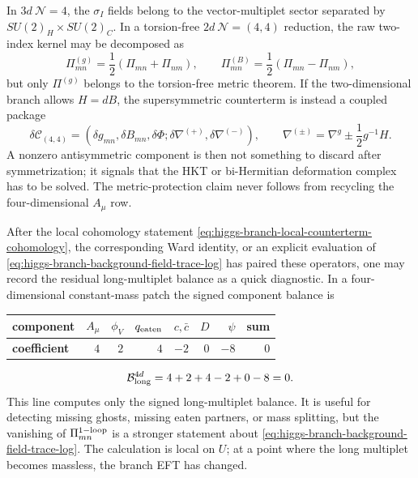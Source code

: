 \begin{example}
In \(3d\ \mathcal N=4\), the \(\sigma_I\) fields belong to the vector-multiplet
sector separated by \(SU(2)_H\times SU(2)_C\).  In a torsion-free
\(2d\ \mathcal N=(4,4)\) reduction, the raw two-index kernel may be decomposed
as
\[
  \Pi_{mn}^{(g)}
  =
  \frac12(\Pi_{mn}+\Pi_{nm}),
  \qquad
  \Pi_{mn}^{(B)}
  =
  \frac12(\Pi_{mn}-\Pi_{nm}),
\]
but only \(\Pi^{(g)}\) belongs to the torsion-free metric theorem.  If the
two-dimensional branch allows \(H=dB\), the supersymmetric counterterm is instead
a coupled package
\[
  \delta{\mathcal C}_{(4,4)}
  =
  (\delta g_{mn},\delta B_{mn},\delta\Phi;\delta\nabla^{(+)},
  \delta\nabla^{(-)}),
  \qquad
  \nabla^{(\pm)}
  =
  \nabla^g\pm\frac12 g^{-1}H .
\]
A nonzero antisymmetric component is then not something to discard after
symmetrization; it signals that the HKT or bi-Hermitian deformation complex has
to be solved.  The metric-protection claim never follows from recycling the
four-dimensional \(A_\mu\) row.
\end{example}

After the local cohomology statement
\eqref{eq:higgs-branch-local-counterterm-cohomology}, the corresponding Ward
identity, or an explicit evaluation of
\eqref{eq:higgs-branch-background-field-trace-log} has paired these operators,
one may record the residual long-multiplet balance as a quick diagnostic.  In a
four-dimensional constant-mass patch the signed component balance is
\begin{center}
\begin{tabular}{@{}lrrrrrrr@{}}
\textbf{component}
& \(A_\mu\) & \(\phi_V\) & \(q_{\rm eaten}\)
& \(c,\bar c\) & \(D\) & \(\psi\) & \textbf{sum}\\ \hline
\textbf{coefficient}
& \(4\) & \(2\) & \(4\) & \(-2\) & \(0\) & \(-8\) & \(0\)
\end{tabular}
\end{center}
\begin{equation}
  {\mathcal B}_{\rm long}^{4d}
  =
  4+2+4-2+0-8
  =
  0 .
  \label{eq:higgs-branch-heavy-multiplet-balance-heuristic}
\end{equation}
This line computes only the signed long-multiplet balance.  It is useful for
detecting missing ghosts, missing eaten partners, or mass splitting, but the
vanishing of \(\Pi_{mn}^{\rm 1-loop}\) is a stronger statement about
\eqref{eq:higgs-branch-background-field-trace-log}.  The calculation is local
on \(U\); at a point where the long multiplet becomes massless, the branch EFT
has changed.

